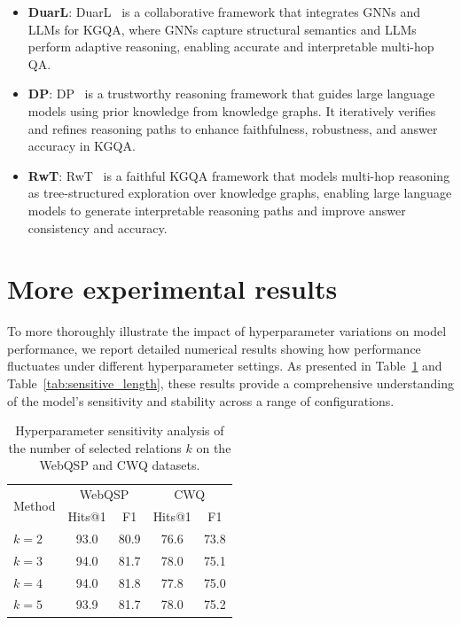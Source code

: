 \begin{itemize}
\begin{itemize}
    \item \textbf{DuarL}: DuarL~\cite{liu2025dual} is a collaborative framework that integrates GNNs and LLMs for KGQA, where GNNs capture structural semantics and LLMs perform adaptive reasoning, enabling accurate and interpretable multi-hop QA.
    \item \textbf{DP}: DP~\cite{ma2025deliberation} is a trustworthy reasoning framework that guides large language models using prior knowledge from knowledge graphs. It iteratively verifies and refines reasoning paths to enhance faithfulness, robustness, and answer accuracy in KGQA.
    \item \textbf{RwT}: RwT~\cite{shen2025reasoning} is a faithful KGQA framework that models multi-hop reasoning as tree-structured exploration over knowledge graphs, enabling large language models to generate interpretable reasoning paths and improve answer consistency and accuracy.

\end{itemize}

\end{itemize}

\section{More experimental results}\label{sec:experiments_results}

To more thoroughly illustrate the impact of hyperparameter variations on model performance, we report detailed numerical results showing how performance fluctuates under different hyperparameter settings. As presented in Table~\ref{tab:sensitive_k} and Table~\ref{tab:sensitive_length}, these results provide a comprehensive understanding of the model’s sensitivity and stability across a range of configurations.

\begin{table}[t]
\centering
\small
\begin{tabular}{lcccc}
\toprule
\multirow{2}{*}{Method} & \multicolumn{2}{c}{WebQSP} & \multicolumn{2}{c}{CWQ} \\
 & Hits@1 & F1 & Hits@1 & F1 \\
\midrule
$k=2$ & 93.0 & 80.9 & 76.6 & 73.8 \\
$k=3$ & 94.0 & 81.7 & 78.0 & 75.1 \\
$k=4$ & 94.0 & 81.8 & 77.8 & 75.0 \\
$k=5$ & 93.9 & 81.7 & 78.0 & 75.2 \\
\bottomrule
\end{tabular}
\caption{Hyperparameter sensitivity analysis of the number of selected relations $k$ on the WebQSP and CWQ datasets.}
\label{tab:sensitive_k}
\end{table}



